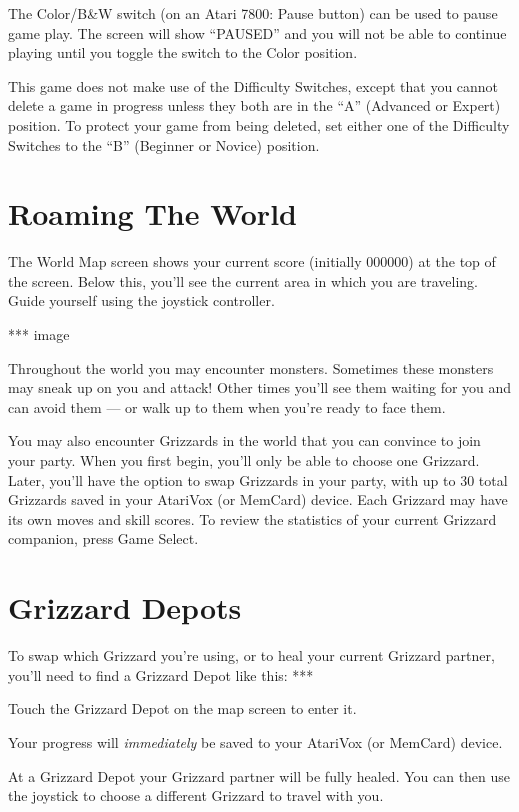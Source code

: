 \documentclass[12pt,twoside,openright,book]{memoir}
\begin{document}
The Color/B\&W switch (on an Atari 7800: Pause button) can be used to pause
game play. The screen will show ``PAUSED'' and you will not be able to
continue playing until you toggle the switch to the Color position.

This game does not make use  of the Difficulty Switches, except that you
cannot  delete a  game in  progress unless  they both  are in  the ``A''
(Advanced or Expert) position. To  protect your game from being deleted,
set either  one of  the Difficulty  Switches to  the ``B''  (Beginner or
Novice) position.


\section{Roaming The World}

The World Map screen shows your  current score (initially 000000) at the
top of the screen. Below this, you'll  see the current area in which you
are traveling. Guide yourself using the joystick controller.

*** image

Throughout  the  world  you  may  encounter  monsters.  Sometimes  these
monsters may  sneak up on  you and attack!  Other times you'll  see them
waiting for you  and can avoid them  --- or walk up to  them when you're
ready to face them.

You may also  encounter Grizzards in the world that  you can convince to
join your party. When you first begin, you'll only be able to choose one
Grizzard. Later, you'll have the option to swap Grizzards in your party,
with  up to  30  total Grizzards  saved in  your  AtariVox (or  MemCard)
device. Each Grizzard may have its own moves and skill scores. To review
the statistics of your current Grizzard companion, press Game Select.

\section{Grizzard Depots}

To swap which Grizzard you're using, or to heal your current Grizzard
partner, you'll need to find a Grizzard Depot like this: ***

Touch the Grizzard Depot on the map screen to enter it.

Your  progress will  \emph{immediately} be  saved to  your AtariVox  (or
MemCard) device.

At a Grizzard Depot your Grizzard partner will be fully healed. You can
then use the joystick to choose a different Grizzard to travel with you.
\end{document}

